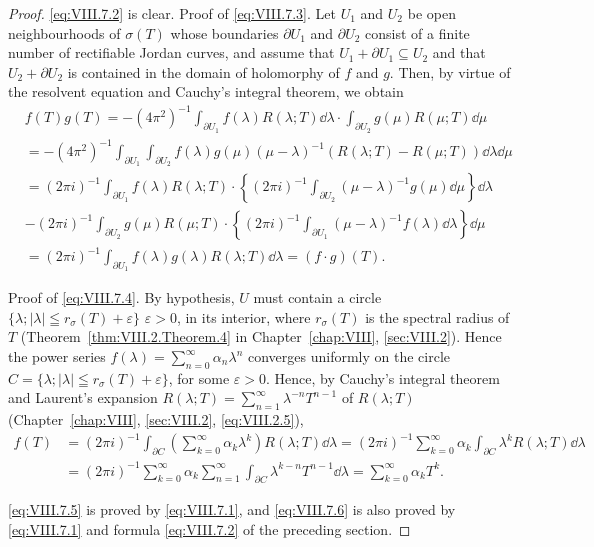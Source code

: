 \begin{proof}
 \eqref{eq:VIII.7.2} is clear. Proof of \eqref{eq:VIII.7.3}. Let $U_{1}$ and $U_{2}$ be open neighbourhoods of $\sigma(T)$ whose boundaries $\partial U_{1}$ and $\partial U_{2}$ consist of a finite number of rectifiable Jordan curves, and assume that $U_{1} + \partial U_{1} \subseteq U_{2}$ and that $U_{2} + \partial U_{2}$ is contained in the domain of holomorphy of $f$ and $g$. Then, by virtue of the resolvent equation and Cauchy's integral theorem, we obtain 
\[
\begin{aligned}
&f (T) g (T) = - (4 \pi^{2}) ^{-1} \int_ {\partial U _{1}} f (\lambda) R (\lambda ; T) \dd \lambda \cdot \int_ {\partial U _{2}} g (\mu) R (\mu ; T) \dd \mu
\\
&= - (4 \pi^{2}) ^{-1} \int_ {\partial U _{1}} \int_ {\partial U _{2}} f (\lambda) g (\mu) (\mu - \lambda) ^{-1} (R (\lambda ; T) - R (\mu ; T)) \dd \lambda \dd \mu
\\
&= (2 \pi i) ^{-1} \int_ {\partial U _{1}} f (\lambda) R (\lambda ; T) \cdot \left\{(2 \pi i) ^{-1} \int_ {\partial U _{2}} (\mu - \lambda) ^{-1} g (\mu) \dd \mu \right\} \dd \lambda
\\
&- (2 \pi i) ^{-1} \int_ {\partial U _{2}} g (\mu) R (\mu ; T) \cdot \left\{(2 \pi i) ^{-1} \int_ {\partial U _{1}} (\mu - \lambda) ^{-1} f (\lambda) \dd \lambda \right\} \dd \mu
\\
&= (2 \pi i) ^{-1} \int_ {\partial U _{1}} f (\lambda) g (\lambda) R (\lambda ; T) \dd \lambda = (f \cdot g) (T).
\end{aligned}
\]

Proof of \eqref{eq:VIII.7.4}. By hypothesis, $U$ must contain a circle $\{\lambda; |\lambda| \leqq r_{\sigma}(T) + \varepsilon\}$ $\varepsilon > 0$, in its interior, where $r_{\sigma}(T)$ is the spectral radius of $T$ (Theorem~\ref{thm:VIII.2.Theorem.4} in Chapter~\ref{chap:VIII}, \ref{sec:VIII.2}). Hence the power series $f(\lambda) = \sum\limits_{n=0}^{\infty} \alpha_n \lambda^n$ converges uniformly on the circle $C = \{\lambda; |\lambda| \leqq r_{\sigma}(T) + \varepsilon\}$, for some $\varepsilon > 0$. Hence, by Cauchy's integral theorem and Laurent's expansion $R(\lambda; T) = \sum\limits_{n=1}^{\infty} \lambda^{-n} T^{n-1}$ of $R(\lambda; T)$ (Chapter~\ref{chap:VIII}, \ref{sec:VIII.2}, \eqref{eq:VIII.2.5}), 
\[
\begin{aligned}
f (T) &= (2 \pi i) ^{-1} \int_{\partial C} \left(\sum\limits_{k=0} ^{\infty} \alpha_{k} \lambda^{k}\right) R (\lambda ; T) \dd \lambda = (2 \pi i) ^{-1} \sum\limits_{k=0} ^{\infty} \alpha_{k} \int_{\partial C} \lambda^{k} R (\lambda ; T) \dd \lambda
\\
&= (2 \pi i) ^{-1} \sum\limits_{k=0} ^{\infty} \alpha_{k} \sum\limits_{n=1} ^{\infty} \int_{\partial C} \lambda^{k-n} T ^{n-1} \dd \lambda = \sum\limits_{k=0} ^{\infty} \alpha_{k} T ^{k}.
\end{aligned}
\]

\eqref{eq:VIII.7.5} is proved by \eqref{eq:VIII.7.1}, and \eqref{eq:VIII.7.6} is also proved by \eqref{eq:VIII.7.1} and formula \eqref{eq:VIII.7.2} of the preceding section. 
\end{proof}

